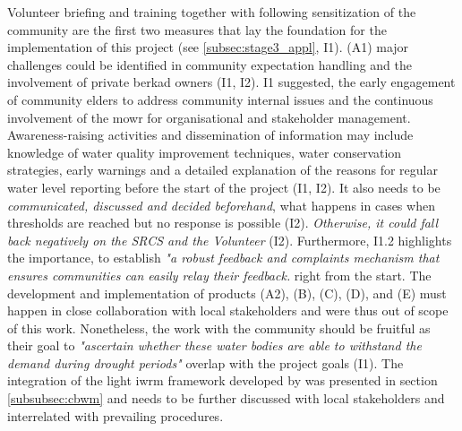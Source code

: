 Volunteer briefing and training together with following sensitization of the community are the first two measures that lay the foundation for the implementation of this project (see \ref*{subsec:stage3_appl}, I1). (A1) major challenges could be identified in community expectation handling and the involvement of private berkad owners (I1, I2). I1 suggested, the early engagement of community elders to address community internal issues and the continuous involvement of the \acrshort{mowr} for organisational and stakeholder management. Awareness-raising activities and dissemination of information may include knowledge of water quality improvement techniques, water conservation strategies, early warnings and a detailed explanation of the reasons for regular water level reporting before the start of the project (I1, I2). It also needs to be \textit{communicated, discussed and decided beforehand},  what happens in cases when thresholds are reached but no response is possible (I2). \textit{Otherwise, it could fall back negatively on the SRCS and the Volunteer} (I2). Furthermore, I1.2 highlights the importance, to establish \textit{"a robust feedback and complaints mechanism that ensures communities can easily relay their feedback.} right from the start. The development and implementation of products (A2), (B), (C), (D), and (E) must happen in close collaboration with local stakeholders and were thus out of scope of this work. Nonetheless, the work with the community should be fruitful as their goal to \textit{"ascertain whether these water bodies are able to withstand the demand during drought periods"} overlap with the project goals (I1).\newline
The integration of the light \acrshort{iwrm} framework developed by \autocite{dayCommunitybasedWaterResources2009} was presented in section \ref*{subsubsec:cbwm} and needs to be further discussed with local stakeholders and interrelated with prevailing procedures.




